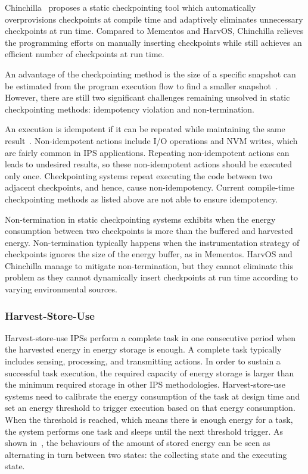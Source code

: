 Chinchilla~\cite{maeng2018adaptive} proposes a static checkpointing tool which automatically overprovisions checkpoints at compile time and adaptively eliminates unnecessary checkpoints at run time. 
Compared to Mementos and HarvOS, Chinchilla relieves the programming efforts on manually inserting checkpoints while still achieves an efficient number of checkpoints at run time.

An advantage of the checkpointing method is the size of a specific snapshot can be estimated from the program execution flow to find a smaller snapshot~\cite{bhatti2017harvos}. 
However, there are still two significant challenges remaining unsolved in static checkpointing methods: idempotency violation and non-termination. 

An execution is idempotent if it can be repeated while maintaining the same result~\cite{lucia2015simpler}. 
Non-idempotent actions include I/O operations and NVM writes, which are fairly common in IPS applications. 
Repeating non-idempotent actions can leads to undesired results, so these non-idempotent actions should be executed only once. 
Checkpointing systems repeat executing the code between two adjacent checkpoints, and hence, cause non-idempotency. 
Current compile-time checkpointing methods as listed above are not able to ensure idempotency. 

Non-termination in static checkpointing systems exhibits when the energy consumption between two checkpoints is more than the buffered and harvested energy. 
Non-termination typically happens when the instrumentation strategy of checkpoints ignores the size of the energy buffer, as in Mementos. 
HarvOS and Chinchilla manage to mitigate non-termination, but they cannot eliminate this problem as they cannot dynamically insert checkpoints at run time according to varying environmental sources. 

\subsubsection{Harvest-Store-Use}

Harvest-store-use IPSs perform a complete task in one consecutive period when the harvested energy in energy storage is enough. 
A complete task typically includes sensing, processing, and transmitting actions. 
In order to sustain a successful task execution, the required capacity of energy storage is larger than the minimum required storage in other IPS methodologies. 
Harvest-store-use systems need to calibrate the energy consumption of the task at design time and set an energy threshold to trigger execution based on that energy consumption. 
When the threshold is reached, which means there is enough energy for a task, the system performs one task and sleeps until the next threshold trigger. 
As shown in~, the behaviours of the amount of stored energy can be seen as alternating in turn between two states: the collecting state and the executing state.

